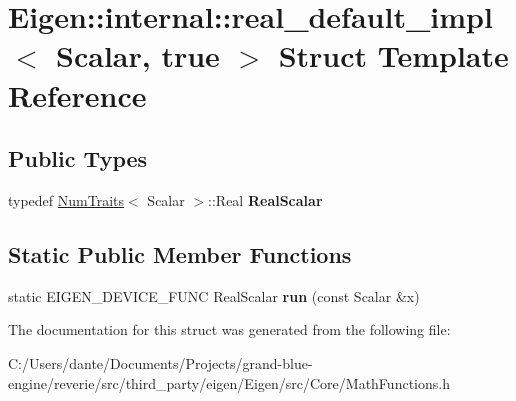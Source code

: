 \hypertarget{struct_eigen_1_1internal_1_1real__default__impl_3_01_scalar_00_01true_01_4}{}\section{Eigen\+::internal\+::real\+\_\+default\+\_\+impl$<$ Scalar, true $>$ Struct Template Reference}
\label{struct_eigen_1_1internal_1_1real__default__impl_3_01_scalar_00_01true_01_4}
\subsection*{Public Types}
\begin{DoxyCompactItemize}
\item 
\mbox{\label{struct_eigen_1_1internal_1_1real__default__impl_3_01_scalar_00_01true_01_4_ad955f4b83dfa41fa283c7904ad582cdd}} 
typedef \mbox{\hyperlink{struct_eigen_1_1_num_traits}{Num\+Traits}}$<$ Scalar $>$\+::Real {\bfseries Real\+Scalar}
\end{DoxyCompactItemize}
\subsection*{Static Public Member Functions}
\begin{DoxyCompactItemize}
\item 
\mbox{\label{struct_eigen_1_1internal_1_1real__default__impl_3_01_scalar_00_01true_01_4_a0a89e41163717e5d5d4b6fd2ed586523}} 
static E\+I\+G\+E\+N\+\_\+\+D\+E\+V\+I\+C\+E\+\_\+\+F\+U\+NC Real\+Scalar {\bfseries run} (const Scalar \&x)
\end{DoxyCompactItemize}


The documentation for this struct was generated from the following file\+:\begin{DoxyCompactItemize}
\item 
C\+:/\+Users/dante/\+Documents/\+Projects/grand-\/blue-\/engine/reverie/src/third\+\_\+party/eigen/\+Eigen/src/\+Core/Math\+Functions.\+h\end{DoxyCompactItemize}
